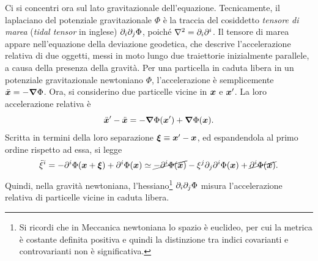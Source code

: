 Ci si concentri ora sul lato gravitazionale dell'equazione. Tecnicamente, il laplaciano del potenziale gravitazionale $\Phi$ è la traccia del cosiddetto \emph{tensore di marea} (\emph{tidal tensor} in inglese) $\partial_i \partial_j \Phi$, poiché $\nabla^2 = \partial_i \partial^i$. Il tensore di marea appare nell'equazione della deviazione geodetica, che descrive l'accelerazione relativa di due oggetti, messi in moto lungo due traiettorie inizialmente parallele, a causa della presenza della gravità. Per una particella in caduta libera in un potenziale gravitazionale newtoniano $\Phi$, l'accelerazione è semplicemente $\ddot{\bm{x}} = -\bm{\nabla}\Phi$. Ora, si considerino due particelle vicine in $\bm{x}$ e $\bm{x}'$. La loro accelerazione relativa è
\begin{equation}
    \ddot{\bm{x}}' - \ddot{\bm{x}} = -\bm{\nabla}\Phi(\bm{x}') + \bm{\nabla}\Phi(\bm{x}).
\end{equation}
Scritta in termini della loro separazione $\bm{\xi} \equiv \bm{x}' - \bm{x}$, ed espandendola al primo ordine rispetto ad essa, si legge
\begin{equation}
\label{eq: accelerazione relativa di due particelle (newtoniana)}
    \ddot{\xi}^i = -\partial^i \Phi(\bm{x}+\bm{\xi}) + \partial^i \Phi(\bm{x}) \simeq \cancel{-\partial^i \Phi(\bm{x})} - \xi^j \partial_j \partial^i \Phi(\bm{x}) + \cancel{\partial^i \Phi(\bm{x})}.
\end{equation}
Quindi, nella gravità newtoniana, l'hessiano\footnote{Si ricordi che in Meccanica newtoniana lo spazio è euclideo, per cui la metrica è costante definita positiva e quindi la distinzione tra indici covarianti e controvarianti non è significativa.} $\partial_i \partial_j \Phi$ misura l'accelerazione relativa di particelle vicine in caduta libera.

